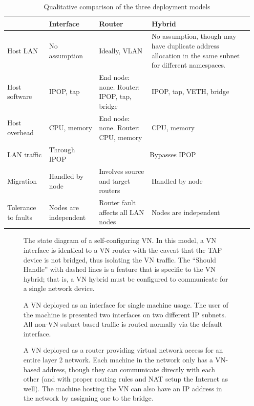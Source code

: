 \begin{table}[ht]
\caption{Qualitative comparison of the three deployment models}
\label{tab:three_models}
\centering
\begin{tabular}{|p{1in}||p{1.25in}|p{1.5in}|p{2.25in}|} \hline
 & Interface & Router & Hybrid \\ \hline\hline
Host LAN 
& 
No assumption 
& 
Ideally, VLAN
&
No assumption, though may have duplicate address allocation in the same subnet
for different namespaces.\footnotemark[2]
\\ \hline
Host software
&
IPOP, tap
&
End node: none. Router: IPOP, tap, bridge 
&
IPOP, tap, VETH, bridge \\ \hline
Host overhead
&
CPU, memory
& 
End node: none. Router: CPU, memory
&
CPU, memory \\ \hline
LAN traffic
&
Through IPOP
&
\multicolumn{2}{c|}{Bypasses IPOP} \\ \hline
Migration
&
Handled by node
&
Involves source and target routers
&
Handled by node \\ \hline
Tolerance to faults
&
Nodes are independent
&
Router fault affects all LAN nodes
&
Nodes are independent \\ \hline
\end{tabular}
\end{table}

\begin{figure}[ht]
\centering
{}
\caption[The state diagram of a self-configuring VN.]{The state diagram of a
self-configuring VN.  In this model, a VN interface is identical to a VN router
with the caveat that the TAP device is not bridged, thus isolating the VN
traffic.  The ``Should Handle'' with dashed lines is a feature that is specific
to the VN hybrid; that is, a VN hybrid must be configured to communicate for a
single network device.}
\label{fig:vn}
\end{figure}

\begin{figure}[ht]
\centering
{}
\caption[VN Interface]{A VN deployed as an interface for single machine usage.
The user of the machine is presented two interfaces on two different IP subnets.
All non-VN subnet based traffic is routed normally via the default interface.}
\label{fig:interface}
\end{figure}

\begin{figure}[ht]
\centering
{}
\caption[VN Router]{A VN deployed as a router providing virtual network access
for an entire layer 2 network.  Each machine in the network only has a VN-based
address, though they can communicate directly with each other (and with proper
routing rules and NAT setup the Internet as well).  The machine hosting the VN
can also have an IP address in the network by assigning one to the bridge.}
\label{fig:router}
\end{figure}

